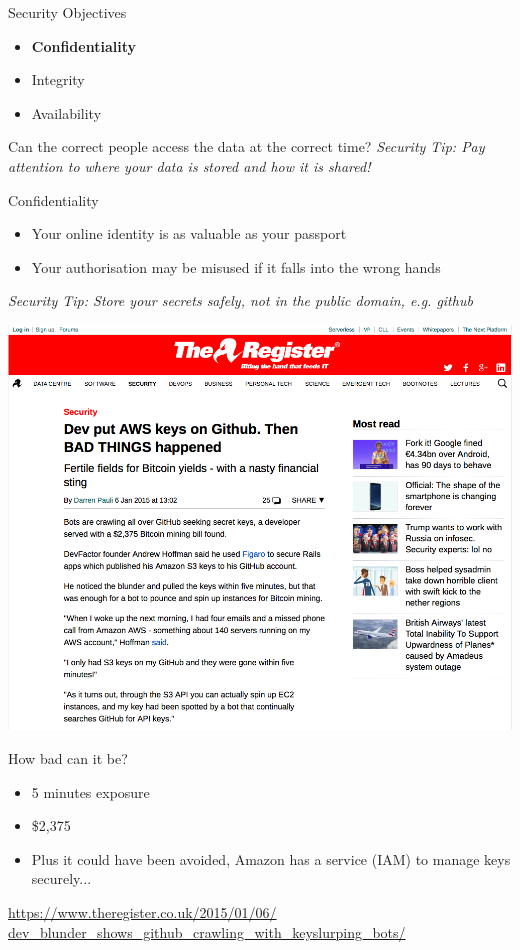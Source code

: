 \documentclass{beamer}
\begin{document}
\begin{frame}{Security Objectives}
	\begin{itemize}
		\item \textbf{Confidentiality}
		\item Integrity
        \item Availability
	\end{itemize}
    Can the correct people access the data at the correct time?
	\linebreak
    \linebreak
    { \color{red} \textit{Security Tip: Pay attention to where your data is stored and how it is shared!} }
\end{frame}

\begin{frame}{Confidentiality}
\begin{itemize}
\item Your online identity is as valuable as your passport 
\item Your authorisation may be misused if it falls into the wrong hands
\end{itemize}
{ \color{red} \textit{Security Tip: Store your secrets safely, not in the public domain, e.g. github} }
\end{frame}

\begin{frame}{}
\begin{center}
\includegraphics[width=0.8\linewidth]{github-bitcoin.png}
\end{center}
\end{frame}

\begin{frame}{How bad can it be?}
\begin{itemize}
\item 5 minutes exposure
\item \$2,375
\item Plus it could have been avoided, Amazon has a service (IAM) to manage keys securely...
\end{itemize}
{\small \url{https://www.theregister.co.uk/2015/01/06/ dev_blunder_shows_github_crawling_with_keyslurping_bots/} \par}
\end{frame}
\end{document}
